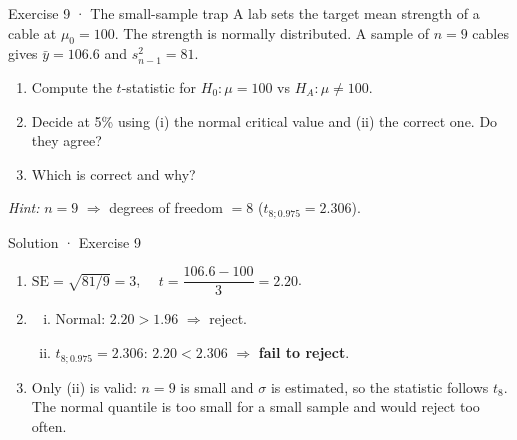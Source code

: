 \documentclass[
  11pt,
  ignorenonframetext,
  aspectratio=169,
]{beamer}
\providecommand{\tightlist}{%
  \setlength{\itemsep}{0pt}\setlength{\parskip}{0pt}}
\newcommand{\se}{\mathrm{SE}}
\begin{document}
\begin{frame}{Exercise 9 · The small-sample trap}
\protect{}\label{exercise-9-the-small-sample-trap}
A lab sets the target mean strength of a cable at \(\mu_0=100\). The
strength is normally distributed. A sample of \(n=9\) cables gives
\(\bar y=106.6\) and \(s^2_{n-1}=81\).

\begin{enumerate}
\tightlist
\item
  Compute the \(t\)-statistic for \(H_0:\mu=100\) vs \(H_A:\mu\neq100\).
\item
  Decide at 5\% using (i) the normal critical value and (ii) the correct
  one. Do they agree?
\item
  Which is correct and why?
\end{enumerate}

\emph{Hint:} \(n=9\) \(\Rightarrow\) degrees of freedom \(=8\)
(\(t_{8;0.975}=2.306\)).
\end{frame}

\begin{frame}{Solution · Exercise 9}
\protect{}\label{solution-exercise-9}
\begin{enumerate}
\tightlist
\item
  \(\se=\sqrt{81/9}=3\), \(\quad t=\dfrac{106.6-100}{3}=\mathbf{2.20}\).
\item
  \begin{enumerate}
  [(i)]
  \tightlist
  \item
    Normal: \(2.20>1.96\) \(\Rightarrow\) reject.
  \item
    \(t_{8;0.975}=2.306\): \(2.20<2.306\) \(\Rightarrow\) \textbf{fail
    to reject}.
  \end{enumerate}
\item
  Only (ii) is valid: \(n=9\) is small and \(\sigma\) is estimated, so
  the statistic follows \(t_8\). The normal quantile is too small for a
  small sample and would reject too often.
\end{enumerate}
\end{frame}

\end{document}
